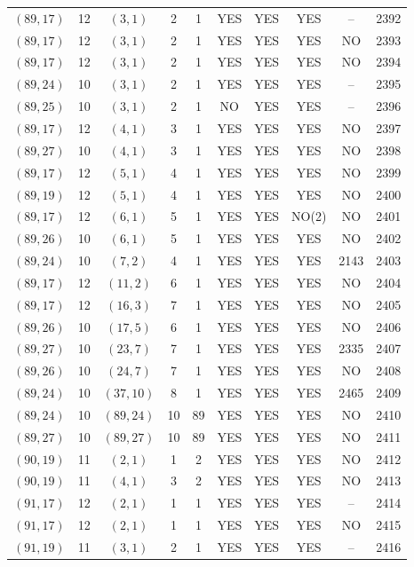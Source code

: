 \begin{longtable}{|c|c|c|c|c|c|c|c|c|c|}
$(89, 17)$ & 12 & $(3, 1)$ & 2 & 1 & YES & YES & YES & -- & 2392\\
$(89, 17)$ & 12 & $(3, 1)$ & 2 & 1 & YES & YES & YES & NO & 2393\\
$(89, 17)$ & 12 & $(3, 1)$ & 2 & 1 & YES & YES & YES & NO & 2394\\
$(89, 24)$ & 10 & $(3, 1)$ & 2 & 1 & YES & YES & YES & -- & 2395\\
$(89, 25)$ & 10 & $(3, 1)$ & 2 & 1 & NO & YES & YES & -- & 2396\\
$(89, 17)$ & 12 & $(4, 1)$ & 3 & 1 & YES & YES & YES & NO & 2397\\
$(89, 27)$ & 10 & $(4, 1)$ & 3 & 1 & YES & YES & YES & NO & 2398\\
$(89, 17)$ & 12 & $(5, 1)$ & 4 & 1 & YES & YES & YES & NO & 2399\\
$(89, 19)$ & 12 & $(5, 1)$ & 4 & 1 & YES & YES & YES & NO & 2400\\
$(89, 17)$ & 12 & $(6, 1)$ & 5 & 1 & YES & YES & NO(2) & NO & 2401\\
$(89, 26)$ & 10 & $(6, 1)$ & 5 & 1 & YES & YES & YES & NO & 2402\\
$(89, 24)$ & 10 & $(7, 2)$ & 4 & 1 & YES & YES & YES & 2143 & 2403\\
$(89, 17)$ & 12 & $(11, 2)$ & 6 & 1 & YES & YES & YES & NO & 2404\\
$(89, 17)$ & 12 & $(16, 3)$ & 7 & 1 & YES & YES & YES & NO & 2405\\
$(89, 26)$ & 10 & $(17, 5)$ & 6 & 1 & YES & YES & YES & NO & 2406\\
$(89, 27)$ & 10 & $(23, 7)$ & 7 & 1 & YES & YES & YES & 2335 & 2407\\
$(89, 26)$ & 10 & $(24, 7)$ & 7 & 1 & YES & YES & YES & NO & 2408\\
$(89, 24)$ & 10 & $(37, 10)$ & 8 & 1 & YES & YES & YES & 2465 & 2409\\
$(89, 24)$ & 10 & $(89, 24)$ & 10 & 89 & YES & YES & YES & NO & 2410\\
$(89, 27)$ & 10 & $(89, 27)$ & 10 & 89 & YES & YES & YES & NO & 2411\\
$(90, 19)$ & 11 & $(2, 1)$ & 1 & 2 & YES & YES & YES & NO & 2412\\
$(90, 19)$ & 11 & $(4, 1)$ & 3 & 2 & YES & YES & YES & NO & 2413\\
$(91, 17)$ & 12 & $(2, 1)$ & 1 & 1 & YES & YES & YES & -- & 2414\\
$(91, 17)$ & 12 & $(2, 1)$ & 1 & 1 & YES & YES & YES & NO & 2415\\
$(91, 19)$ & 11 & $(3, 1)$ & 2 & 1 & YES & YES & YES & -- & 2416\\

\end{longtable}
